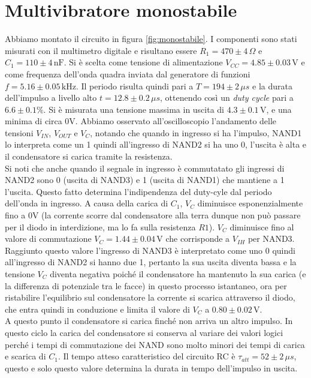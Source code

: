 \documentclass[10pt,a4paper]{article}
\begin{document}
\section{Multivibratore monostabile}
Abbiamo montato il circuito in figura \ref{fig:monostabile}. I componenti sono stati misurati con il multimetro digitale e risultano essere $R_1= 470\pm4\,\Omega$ e $C_1= 110\pm4 \,\text{nF} $. Si è scelta come tensione di alimentazione $V_{CC}= 4.85\pm0.03\,\text{V}$ e come frequenza dell'onda quadra inviata dal generatore di funzioni $f = 5.16\pm0.05\,\text{kHz}$. Il periodo risulta quindi pari a $T=194\pm2\,\mu s$ e la durata dell'impulso a livello alto $t=12.8\pm0.2\,\mu s$, ottenendo così un \emph{duty cycle} pari a $6.6\pm0.1\% $. Si è misurata una tensione massima in uscita di $4.3\pm0.1\,\text{V}$, e una minima di circa 0V. Abbiamo osservato all'oscilloscopio l'andamento delle tensioni $V_{IN}$, $V_{OUT}$ e $V_{C}$, notando che quando in ingresso si ha l'impulso, NAND1 lo interpreta come un 1 quindi all'ingresso di NAND2 si ha uno 0, l'uscita è alta e il condensatore si carica tramite la resistenza.\\
Si noti che anche quando il segnale in ingresso è commutatato gli ingressi di NAND2 sono 0 (uscita di NAND3) e 1 (uscita di NAND1) che mantiene a 1 l'uscita. Questo fatto determina l'indipendenza del duty-cyle dal periodo dell'onda in ingresso. A causa della carica di $C_1$, $V_C$ diminuisce esponenzialmente fino a $0$V (la corrente scorre dal condensatore  alla terra dunque non può passare per il diodo in interdizione, ma lo fa sulla resistenza $R1$). $V_C$ diminuisce fino al valore di commutazione $V_C=1.44\pm0.04\,\text{V}$ che corrisponde a $V_{IH}$ per NAND3.\\
 Raggiunto questo valore l'ingresso di NAND3 è interpretato come uno 0 quindi all'ingresso di NAND2 si hanno due 1, pertanto la sua uscita diventa bassa e la tensione $V_C$ diventa negativa poiché  il condensatore ha mantenuto la sua carica (e la differenza di potenziale tra le facce) in questo processo istantaneo, ora per ristabilire l'equilibrio sul condensatore la corrente si scarica attraverso il diodo, che entra quindi in conduzione e limita il valore di $V_C$ a $0.80\pm0.02\,\text{V}$.\\
A questo punto il condensatore si carica finché non arriva un altro impulso. In questo ciclo la carica del condensatore si conserva al variare dei valori logici perché i tempi di commutazione dei NAND sono molto minori dei tempi di carica e scarica di $C_1$. Il tempo atteso caratteristico del circuito RC è $\tau_{att}=52\pm2\,\mu s$, questo e solo questo valore determina la durata in tempo dell'impulso in uscita.\\
\end{document}
